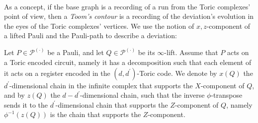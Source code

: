 \paragraph{}

As a concept, if the base graph is a recording of a run from the Toric complexes' point of view, then a \textit{Toom's contour} is a recording of the deviation's evolution in the eyes of the Toric complexes' vertices. We use the notion of $x,z$-component of a lifted Pauli and the Pauli-path to describe a deviation:
\begin{definition}
Let $P \in \mathcal{P}^{(\cdot)}$ be a Pauli, and let $Q \in \mathcal{P}^{(\cdot)}$ be its $\infty$-lift. Assume that $P$ acts on a Toric encoded circuit, namely it has a decomposition such that each element of it acts on a register encoded in the $(d,d^{\prime})$-Toric code. We denote by $x(Q)$ the $d^{\prime}$-dimensional chain in the infinite complex that supports the $X$-component of $Q$, and by $z(Q)$ the $d-d^{\prime}$-dimensional chain, such that the inverse $\phi$-transpose sends it to the $d^{\prime}$-dimensional chain that supports the $Z$-component of $Q$, namely $\phi^{-1}(z(Q))$ is the chain that supports the $Z$-component.



\end{definition}

